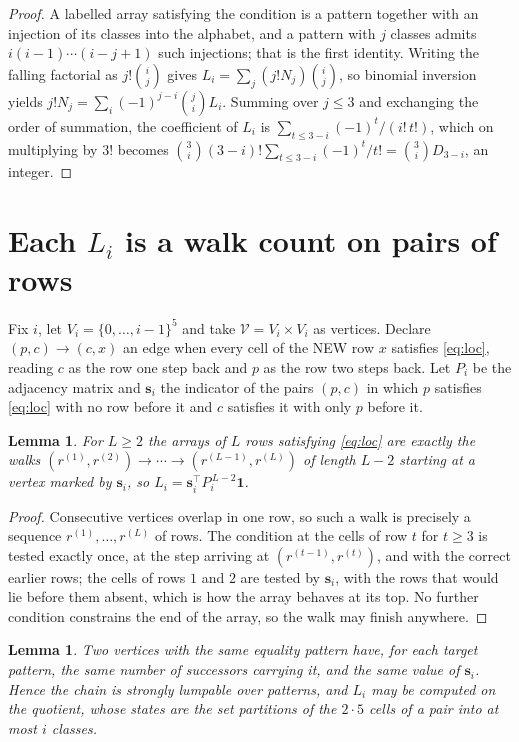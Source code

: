 \documentclass[11pt,a4paper]{article}
\theoremstyle{plain}
\newtheorem{lemma}[theorem]{Lemma}
\theoremstyle{definition}
\begin{document}
\begin{proof}
A labelled array satisfying the condition is a pattern together with an injection of its
classes into the alphabet, and a pattern with $j$ classes admits $i(i-1)\cdots(i-j+1)$ such
injections; that is the first identity. Writing the falling factorial as $j!\binom{i}{j}$
gives $L_i=\sum_j(j!N_j)\binom{i}{j}$, so binomial inversion yields
$j!N_j=\sum_i(-1)^{j-i}\binom{j}{i}L_i$. Summing over $j\le3$ and exchanging the
order of summation, the coefficient of $L_i$ is $\sum_{t\le3-i}(-1)^t/(i!\,t!)$, which on
multiplying by $3!$ becomes
$\binom{3}{i}(3-i)!\sum_{t\le3-i}(-1)^t/t!=\binom{3}{i}D_{3-i}$, an
integer.
\end{proof}

\section{Each $L_i$ is a walk count on pairs of rows}

Fix $i$, let $V_i=\{0,\dots,i-1\}^{5}$ and take $\mathcal V=V_i\times V_i$ as vertices.
Declare $(p,c)\to(c,x)$ an edge when every cell of the NEW row $x$ satisfies
\eqref{eq:loc}, reading $c$ as the row one step back and $p$ as the row two steps
back. Let $P_i$ be the adjacency matrix and $\mathbf{s}_i$ the indicator of the pairs
$(p,c)$ in which $p$ satisfies \eqref{eq:loc} with no row before it and $c$ satisfies it
with only $p$ before it.

\begin{lemma}\label{lem:walk}
For $L\ge2$ the arrays of $L$ rows satisfying \eqref{eq:loc} are exactly the walks
$(r^{(1)},r^{(2)})\to\cdots\to(r^{(L-1)},r^{(L)})$ of length $L-2$ starting at a
vertex marked by $\mathbf{s}_i$, so
$L_i=\mathbf{s}_i^{\!\top}P_i^{\,L-2}\mathbf{1}$.
\end{lemma}

\begin{proof}
Consecutive vertices overlap in one row, so such a walk is precisely a sequence
$r^{(1)},\dots,r^{(L)}$ of rows. The condition at the cells of row $t$ for $t\ge3$
is tested exactly once, at the step arriving at $(r^{(t-1)},r^{(t)})$, and with the
correct earlier rows; the cells of rows $1$ and $2$ are tested by $\mathbf{s}_i$, with
the rows that would lie before them absent, which is how the array behaves at its top. No
further condition constrains the end of the array, so the walk may finish anywhere.
\end{proof}

\begin{lemma}\label{lem:lump}
Two vertices with the same equality pattern have, for each target pattern, the same number of
successors carrying it, and the same value of $\mathbf{s}_i$. Hence the chain is strongly
lumpable over patterns, and $L_i$ may be computed on the quotient, whose states are the set
partitions of the $2\cdot5$ cells of a pair into at most $i$ classes.
\end{lemma}
\end{document}

